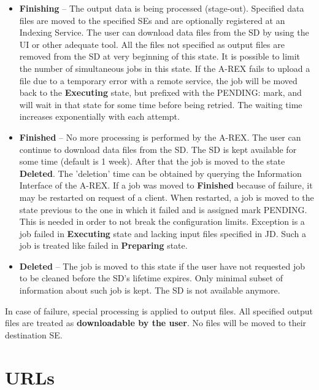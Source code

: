 \documentclass{article}                            %
\begin{document}
\begin{itemize}
\item \textbf{Finishing} -- The output data is being processed
  (stage-out).  Specified data files are moved to the specified SEs
  and are optionally registered at an Indexing Service. The user can
  download data files from the SD by using the UI or other adequate
  tool. All the files not specified as output files are removed from
  the SD at very beginning of this state. It is possible to limit the
  number of simultaneous jobs in this state.  If the A-REX fails to
  upload a file due to a temporary error with a remote service, the
  job will be moved back to the \textbf{Executing} state, but prefixed
  with the PENDING: mark, and will wait in that state for some time
  before being retried. The waiting time increases exponentially with
  each attempt.

\item \textbf{Finished} -- No more processing is performed by the
  A-REX.  The user can continue to download data files from the
  SD. The SD is kept available for some time (default is 1
  week). After that the job is moved to the state
  \textbf{Deleted}. The 'deletion' time can be obtained by querying
  the Information Interface of the A-REX. If a job was moved to
  \textbf{Finished} because of failure, it may be restarted on request
  of a client. When restarted, a job is moved to the state previous to
  the one in which it failed and is assigned mark PENDING.  This is
  needed in order to not break the configuration limits. Exception is
  a job failed in \textbf{Executing} state and lacking input files
  specified in JD. Such a job is treated like failed in
  \textbf{Preparing} state.

\item \textbf{Deleted} -- The job is moved to this state if the user
  have not requested job to be cleaned before the SD's lifetime
  expires.  Only minimal subset of information about such job is
  kept. The SD is not available anymore.

\end{itemize}

In case of failure, special processing is applied to output files.
All specified output files are treated as \textbf{downloadable by the
  user}. No files will be moved to their destination SE.

\section{URLs\label{sec:urls}}
\end{document}
